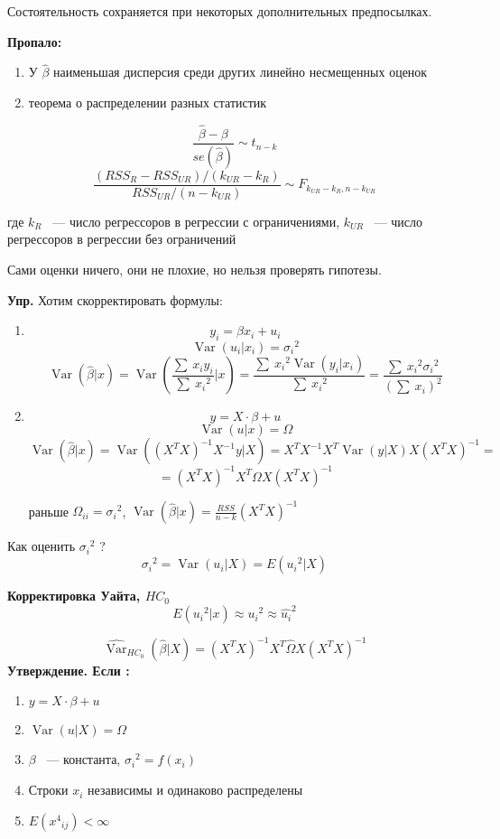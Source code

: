 \documentclass[12pt]{article} %
\theoremstyle{definition} %
\DeclareMathOperator{\Var}{Var}
\begin{document}
Состоятельность сохраняется при некоторых дополнительных предпосылках.

\par

\textbf{Пропало:}
\begin{enumerate}
\item У $ \hat{\beta}  $  наименьшая дисперсия среди других линейно несмещенных оценок
\item  теорема о распределении разных статистик
\end{enumerate}
\[ \frac{ \hat{\beta} - \beta }{se(\hat\beta)} \sim  t_{n-k}  \]
\[ \frac{(RSS_R - RSS_{UR})/(k_{UR} - k_R)}{RSS_{UR}/(n-k_{UR})} \sim F_{k_{UR} - k_R
, n-k_{UR}}   \]

где $k_R$ ~---  число регрессоров в регрессии с ограничениями, $k_{UR}$ ~--- число регрессоров в регрессии без ограничений
\par

\par
Сами оценки ничего, они не плохие, но нельзя проверять гипотезы.
\par


\textbf{Упр.}
 Хотим скорректировать формулы:
\begin{enumerate}

\item
\[y_i = \beta x_i + u_i\]
\[\Var(u_i |x_i) = {\sigma_i}^2 \]
\[\Var(\hat{\beta} |x) = \Var \left (\frac{\displaystyle\sum\ {x_i y_i}}{\displaystyle\sum\ {x_i} ^2}|x \right) =\frac{\displaystyle\sum\ {x_i}^2 \Var(y_i|x_i)}{\displaystyle\sum\ {x_i} ^2} = \frac{\displaystyle\sum\ {x_i}^2 {\sigma_i}^2}{{(\displaystyle\sum\ {x_i}) ^2}}  \]
\item
\[y = X \cdot \beta + u\]
\[\Var(u|x) = \Omega  \]
\[\Var(\hat{\beta} |x) =  \Var ((X^T X)^{-1} X^{-1} y |X ) = X^T X^{-1} X^T \Var(y|X) X (X^T X)^{-1} =\] 
\[ =  (X^T X) ^{-1} X^T \Omega X (X^T X)^ {-1}\]

раньше $ \Omega_{ii} = {\sigma_{i}} ^2$,  
$\Var (\hat{\beta} |x) = \frac {RSS}{n-k} (X^T X)^{-1}$
\end{enumerate}
\par
Как оценить ${\sigma_i}^2$ ? 
\[{\sigma_i}^2 = \Var(u_i |X) = E({u_i}^2 |X) \]
\par
\textbf{Корректировка Уайта, $HC_0$}
\[E({u_i}^2|x) \approx {u_i}^2 \approx {\hat{u_i}^2}\]

\[{\hat{\Var}}_{HC_0} (\hat{\beta}|X) = (X^T X)^{-1} X^T \hat{\Omega} X (X^T X) ^ {-1}   \]
\textbf{Утверждение. Если :}
\begin{enumerate}

\item  $y = X \cdot \beta + u$
\item  $\Var(u|X) = \Omega $
\item  $\beta$ ~---  константа, $ {{\sigma}_i}^2 = f(x_i)$ 
\item  Строки $x_i$ независимы и одинаково распределены
\item  $E({x^4}_{ij}) < \infty$
\end{enumerate}
\end{document}
